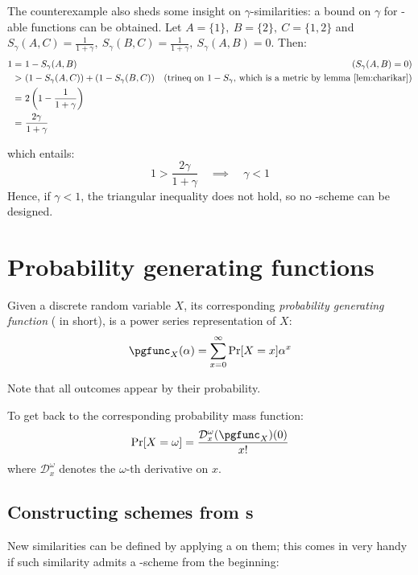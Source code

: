 The counterexample also sheds some insight on $\gamma$-similarities: a bound on $\gamma$ for \lsh-able functions can be obtained. Let $A = \{1\},\ B = \{2\},\ C = \{1, 2\}$ and $S_\gamma(A, C) = \frac{1}{1 + \gamma},\ S_\gamma(B, C) = \frac{1}{1 + \gamma},\ S_\gamma(A, B) = 0$. Then:
\begin{align*}
    1 =&\ 1 - S_\gamma(A, B) 							& (S_\gamma(A, B) = 0) \\
      >&\ (1 - S_\gamma(A, C)) + (1 - S_\gamma(B, C)) 	& \text{(trineq on $1 - S_\gamma$, which is a metric by lemma \ref{lem:charikar})} \\
      =&\ 2 \left( 1 - \frac{1}{1 + \gamma} \right)		& \\
      =&\ \frac{2\gamma}{1 + \gamma} 					&
\end{align*}

which entails:
\[
    1 > \frac{2\gamma}{1 + \gamma} \quad \implies \quad \gamma < 1
\]
Hence, if $\gamma < 1$, the triangular inequality does not hold, so no \lsh-scheme can be designed.

    
\section{Probability generating functions}

\begin{definition}

    Given a discrete random variable $X$, its corresponding \emph{probability generating function} (\pgf{} in short), is a power series representation of $X$:
    \[
        \pgfunc_X(\alpha) = \sum_{x = 0}^{\infty} \Pr[X = x] \alpha^x
    \]

    Note that all outcomes appear by their probability.
\end{definition}

To get back to the corresponding probability mass function:
\[
    \Pr[X = \omega] = \frac{\mathcal{D}_x^\omega(\pgfunc_X)(0)}{x!}
\]
where $\mathcal{D}_x^\omega$ denotes the $\omega$-th derivative on $x$.


\subsection{Constructing schemes from \pgf{}s}

New similarities can be defined by applying a \pgf on them; this comes in very handy if such similarity admits a \lsh-scheme from the beginning:


